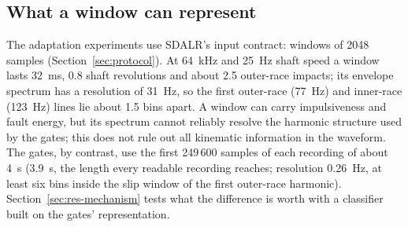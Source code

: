 \subsection{What a window can represent}
\label{sec:windows}

The adaptation experiments use SDALR's input contract: windows of 2048 samples (Section~\ref{sec:protocol}). At
\SI{64}{kHz} and \SI{25}{Hz} shaft speed a window lasts \SI{32}{ms}, 0.8 shaft revolutions and about 2.5 outer-race
impacts; its envelope spectrum has a resolution of \SI{31}{Hz}, so the first outer-race (\SI{77}{Hz}) and inner-race
(\SI{123}{Hz}) lines lie about 1.5 bins apart. A window can carry impulsiveness and fault energy, but its spectrum cannot reliably resolve the harmonic structure used by the gates; this does not rule out all kinematic information in the waveform. The gates, by contrast, use the first 249\,600 samples of each recording of about \SI{4}{s} (\SI{3.9}{s}, the length every
readable recording reaches; resolution \SI{0.26}{Hz}, at least six bins inside the slip window of the first outer-race
harmonic). Section~\ref{sec:res-mechanism}
tests what the difference is worth with a classifier built on the gates' representation.

